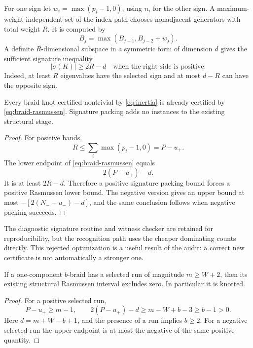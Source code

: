 For one sign let \(w_i=\max(p_i-1,0)\), using \(n_i\) for the other
sign. A maximum-weight independent set of the index path chooses
nonadjacent generators with total weight \(R\). It is computed by
\[
B_j=\max(B_{j-1},B_{j-2}+w_j).
\]
A definite \(R\)-dimensional subspace in a symmetric form of dimension
\(d\) gives the sufficient signature inequality
\begin{equation}\label{eq:inertia}
|\sigma(K)|\ge 2R-d
\quad\text{when the right side is positive}.
\end{equation}
Indeed, at least \(R\) eigenvalues have the selected sign and at most
\(d-R\) can have the opposite sign.

\begin{proposition}[Domination]\label{prop:domination}
Every braid knot certified nontrivial by \eqref{eq:inertia} is already
certified by \eqref{eq:braid-rasmussen}. Signature packing adds no
instances to the existing structural stage.
\end{proposition}

\begin{proof}
For positive bands,
\[
R\le\sum_i\max(p_i-1,0)=P-u_+.
\]
The lower endpoint of \eqref{eq:braid-rasmussen} equals
\[
2(P-u_+)-d.
\]
It is at least \(2R-d\). Therefore a positive signature packing bound
forces a positive Rasmussen lower bound. The negative version gives an
upper bound at most \(-[2(N_--u_-)-d]\), and the same conclusion follows
when negative packing succeeds.
\end{proof}

The diagnostic signature routine and witness checker are retained for
reproducibility, but the recognition path uses the cheaper dominating
counts directly. This rejected optimization is a useful result of the
audit: a correct new certificate is not automatically a stronger one.

\begin{corollary}\label{cor:dominant}
If a one-component \(b\)-braid has a selected run of magnitude
\(m\ge W+2\), then its existing structural Rasmussen interval excludes
zero. In particular it is knotted.
\end{corollary}

\begin{proof}
For a positive selected run,
\[
P-u_+\ge m-1,\qquad
2(P-u_+)-d\ge m-W+b-3\ge b-1>0.
\]
Here \(d=m+W-b+1\), and the presence of a run implies \(b\ge2\).
For a negative selected run the upper endpoint is at most the negative
of the same positive quantity.
\end{proof}

